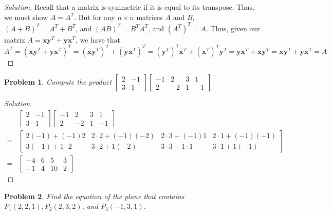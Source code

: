 \documentclass{article}
\theoremstyle{mystyle}
\newtheorem{problem}{Problem}[section]
\begin{document}
\begin{proof}[Solution]
Recall that a matrix is symmetric if it is equal to its transpose. Thus, we must show $A = A^T$. But for any $n\times n$ matrices $A$ and $B$, $(A+B)^T = A^T + B^T$, and $(AB)^T = B^T A^T$, and $(A^T)^T = A$. Thus, given our matrix $A= \mathbf{x}\mathbf{y}^T + \mathbf{y}\mathbf{x}^T$, we have that $A^T = (\mathbf{x}\mathbf{y}^T + \mathbf{y}\mathbf{x}^T)^T = (\mathbf{x}\mathbf{y}^T)^T + (\mathbf{y}\mathbf{x}^T)^T = (\mathbf{y}^T)^T\mathbf{x}^T + (\mathbf{x}^T)^T\mathbf{y}^T = \mathbf{y}\mathbf{x}^T + \mathbf{x}\mathbf{y}^T = \mathbf{x}\mathbf{y}^T + \mathbf{y}\mathbf{x}^T = A$
\end{proof}
\begin{problem}
Compute the product $\begin{bmatrix} 2 & -1 \\ 3 & 1\end{bmatrix} \begin{bmatrix} -1 & 2 & 3 & 1 \\ 2 & -2 & 1 & -1 \end{bmatrix}$
\end{problem}
\begin{proof}[Solution]
\begin{align*}
    &\begin{bmatrix} 2 & -1 \\ 3 & 1\end{bmatrix} \begin{bmatrix} -1 & 2 & 3 & 1 \\ 2 & -2 & 1 & -1 \end{bmatrix}\\
    =&\begin{bmatrix} 2(-1)+(-1)2 & 2\cdot 2 + (-1)(-2) & 2\cdot 3 + (-1)1 & 2\cdot 1 + (-1)(-1) \\ 3(-1)+1\cdot 2 & 3\cdot 2 + 1(-2) & 3\cdot 3 + 1\cdot 1 & 3\cdot 1 + 1(-1)\end{bmatrix}\\
    =&\begin{bmatrix} -4 & 6 & 5 &3 \\ -1 & 4 & 10 & 2\end{bmatrix}
\end{align*}
\end{proof}
\begin{problem}
Find the equation of the plane that contains $P_{1}(2,2,1),P_{2}(2,3,2)$, and $P_{3}(-1,3,1)$.
\end{problem}
\end{document}
